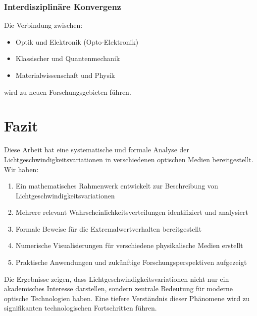 \documentclass[12pt,a4paper,oneside]{article}
\theoremstyle{definition}
\theoremstyle{remark}
\begin{document}
\subsubsection{Interdisziplinäre Konvergenz}

Die Verbindung zwischen:
\begin{itemize}
    \item Optik und Elektronik (Opto-Elektronik)
    \item Klassischer und Quantenmechanik
    \item Materialwissenschaft und Physik
\end{itemize}
wird zu neuen Forschungsgebieten führen.

\section{Fazit}

Diese Arbeit hat eine systematische und formale Analyse der Lichtgeschwindigkeitsvariationen in verschiedenen optischen Medien bereitgestellt. Wir haben:

\begin{enumerate}
    \item Ein mathematisches Rahmenwerk entwickelt zur Beschreibung von Lichtgeschwindigkeitsvariationen
    \item Mehrere relevant Wahrscheinlichkeitsverteilungen identifiziert und analysiert
    \item Formale Beweise für die Extremalwertverhalten bereitgestellt
    \item Numerische Visualisierungen für verschiedene physikalische Medien erstellt
    \item Praktische Anwendungen und zukünftige Forschungsperspektiven aufgezeigt
\end{enumerate}

Die Ergebnisse zeigen, dass Lichtgeschwindigkeitsvariationen nicht nur ein akademisches Interesse darstellen, sondern zentrale Bedeutung für moderne optische Technologien haben. Eine tiefere Verständnis dieser Phänomene wird zu signifikanten technologischen Fortschritten führen.
\end{document}
